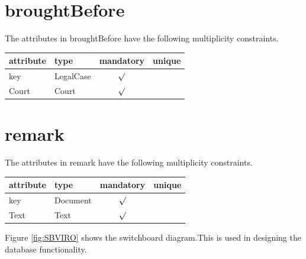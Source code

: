 \documentclass[10pt,a4paper]{report}              %
\theoremstyle{plain}\theorembodyfont{\rmfamily}\newtheorem{definition}{Definition}[section]
\theoremstyle{plain}\theorembodyfont{\rmfamily}\newtheorem{designrule}[definition]{Requirement}
\begin{document}
\section{broughtBefore}

\label{sct:plug broughtBefore}

The attributes in broughtBefore have the following multiplicity constraints. 

\begin{center}
\begin{tabular}{llcc}
attribute & type & mandatory & unique\\
\hline
key  & LegalCase & $\surd$ & \\
Court & Court & $\surd$ & \\
\end{tabular}
\end{center}

\section{remark}

\label{sct:plug remark}

The attributes in remark have the following multiplicity constraints. 

\begin{center}
\begin{tabular}{llcc}
attribute & type & mandatory & unique\\
\hline
key  & Document & $\surd$ & \\
Text & Text & $\surd$ & \\
\end{tabular}
\end{center}

Figure \ref{fig:SBVIRO} shows the switchboard diagram.This is used in designing the database functionality.
\end{document}
